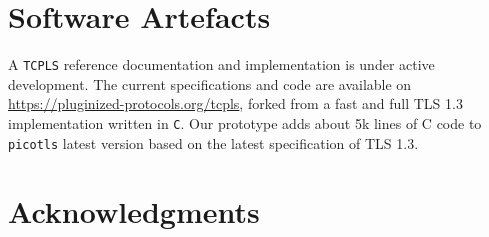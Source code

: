 %


\section*{Software Artefacts}

A \texttt{TCPLS} reference documentation and implementation is under active development. The
current specifications and code are available on
\url{https://pluginized-protocols.org/tcpls}, forked from a fast and
full TLS 1.3 implementation written in \texttt{C}. Our \tcpls prototype adds
about 5k lines of C code to \texttt{picotls} latest version based on the latest
specification of TLS 1.3.

\section*{Acknowledgments}
